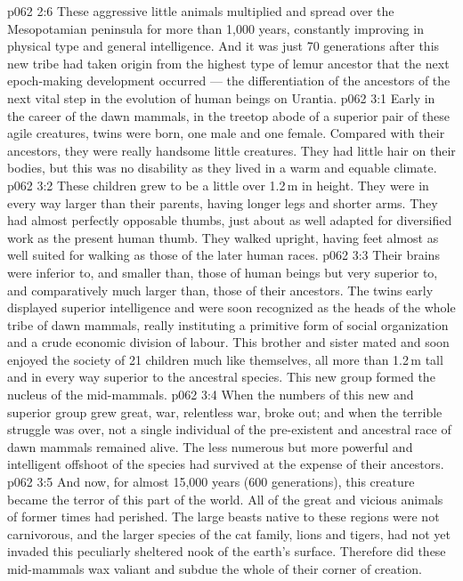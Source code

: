 \vs p062 2:6 These aggressive little animals multiplied and spread over the Mesopotamian peninsula for more than 1,000 years, constantly improving in physical type and general intelligence. And it was just 70 generations after this new tribe had taken origin from the highest type of lemur ancestor that the next epoch\hyp{}making development occurred --- the  differentiation of the ancestors of the next vital step in the evolution of human beings on Urantia.
\vs p062 3:1 Early in the career of the dawn mammals, in the treetop abode of a superior pair of these agile creatures, twins were born, one male and one female. Compared with their ancestors, they were really handsome little creatures. They had little hair on their bodies, but this was no disability as they lived in a warm and equable climate.
\vs p062 3:2 These children grew to be a little over 1.2\,m in height. They were in every way larger than their parents, having longer legs and shorter arms. They had almost perfectly opposable thumbs, just about as well adapted for diversified work as the present human thumb. They walked upright, having feet almost as well suited for walking as those of the later human races.
\vs p062 3:3 Their brains were inferior to, and smaller than, those of human beings but very superior to, and comparatively much larger than, those of their ancestors. The twins early displayed superior intelligence and were soon recognized as the heads of the whole tribe of dawn mammals, really instituting a primitive form of social organization and a crude economic division of labour. This brother and sister mated and soon enjoyed the society of 21 children much like themselves, all more than 1.2\,m tall and in every way superior to the ancestral species. This new group formed the nucleus of the mid\hyp{}mammals.
\vs p062 3:4 When the numbers of this new and superior group grew great, war, relentless war, broke out; and when the terrible struggle was over, not a single individual of the pre\hyp{}existent and ancestral race of dawn mammals remained alive. The less numerous but more powerful and intelligent offshoot of the species had survived at the expense of their ancestors.
\vs p062 3:5 And now, for almost 15,000 years (600 generations), this creature became the terror of this part of the world. All of the great and vicious animals of former times had perished. The large beasts native to these regions were not carnivorous, and the larger species of the cat family, lions and tigers, had not yet invaded this peculiarly sheltered nook of the earth’s surface. Therefore did these mid\hyp{}mammals wax valiant and subdue the whole of their corner of creation.

